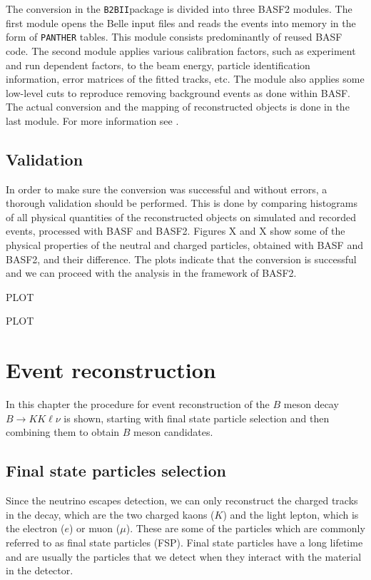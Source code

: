 \documentclass[headings=standardclasses,headings=big,oneside,a4paper,openany,12pt]{scrbook}
\newcommand {\btbii}{\texttt{B2BII}}
\begin{document}
The conversion in the \btbii package is divided into three BASF2 modules. The first module opens the Belle input files and reads the events into memory in the form of \texttt{PANTHER} tables. This module consists predominantly of reused BASF code. The second module applies various calibration factors, such as experiment and run dependent factors, to the beam energy, particle identification information, error matrices of the fitted tracks, etc. The module also applies some low-level cuts to reproduce removing background events as done within BASF. The actual conversion and the mapping of reconstructed objects is done in the last module. For more information see \cite{Keck:48940}.

\section{Validation}

In order to make sure the conversion was successful and without errors, a thorough validation should be performed. This is done by comparing histograms of all physical quantities of the reconstructed objects on simulated and recorded events, processed with BASF and BASF2. Figures X and X show some of the physical properties of the neutral and charged particles, obtained with BASF and BASF2, and their difference. The plots indicate that the conversion is successful and we can proceed with the analysis in the framework of BASF2.

PLOT

PLOT

\chapter{Event reconstruction}

In this chapter the procedure for event reconstruction of the $B$ meson decay $B \to K K \ell \nu$ is shown, starting with final state particle selection and then combining them to obtain $B$ meson candidates.

\section{Final state particles selection}

Since the neutrino escapes detection, we can only reconstruct the charged tracks in the decay, which are the two charged kaons ($K$) and the light lepton, which is the electron ($e$) or muon ($\mu$). These are some of the particles which are commonly referred to as final state particles (FSP). Final state particles have a long lifetime and are usually the particles that we detect when they interact with the material in the detector.
\end{document}
